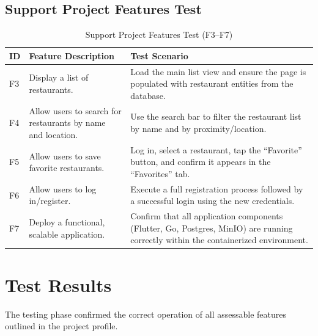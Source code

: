 \subsection{Support Project Features Test}
\begin{table}[H]
	\centering
	\caption{Support Project Features Test (F3--F7)}
	\label{tab:support-features-test}
	{\small\setlength{\tabcolsep}{4pt}
	\begin{tabularx}{\textwidth}{@{}l p{} >{\raggedright\arraybackslash}X@{}}
		\toprule
		\textbf{ID} & \textbf{Feature Description} & \textbf{Test Scenario} \\
		\midrule
		F3 & Display a list of restaurants. & Load the main list view and ensure the page is populated with restaurant entities from the database. \\
		F4 & Allow users to search for restaurants by name and location. & Use the search bar to filter the restaurant list by name and by proximity/location. \\
		F5 & Allow users to save favorite restaurants. & Log in, select a restaurant, tap the ``Favorite'' button, and confirm it appears in the ``Favorites'' tab. \\
		F6 & Allow users to log in/register. & Execute a full registration process followed by a successful login using the new credentials. \\
		F7 & Deploy a functional, scalable application. & Confirm that all application components (Flutter, Go, Postgres, MinIO) are running correctly within the containerized environment. \\
		\bottomrule
	\end{tabularx}}
\end{table}

\section{Test Results}

The testing phase confirmed the correct operation of all assessable features outlined in the project profile.

